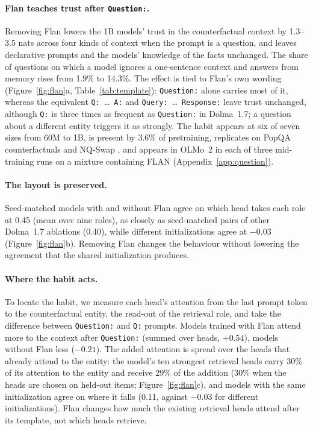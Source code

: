 \documentclass[11pt]{article}
\newcommand{\tmpl}[1]{\texttt{#1}}
\begin{document}
\paragraph{Flan teaches trust after \tmpl{Question:}.}
Removing Flan lowers the 1B models' trust in the counterfactual context by 1.3--3.5 nats across four kinds of context when the prompt is a question, and leaves declarative prompts and the models' knowledge of the facts unchanged.
The share of questions on which a model ignores a one-sentence context and answers from memory rises from 1.9\% to 14.3\%.
The effect is tied to Flan's own wording (Figure~\ref{fig:flan}a, Table~\ref{tab:template}): \tmpl{Question:} alone carries most of it, whereas the equivalent \tmpl{Q:}~\dots~\tmpl{A:} and \tmpl{Query:}~\dots~\tmpl{Response:} leave trust unchanged, although \tmpl{Q:} is three times as frequent as \tmpl{Question:} in Dolma~1.7; a question about a different entity triggers it as strongly.
The habit appears at six of seven sizes from 60M to 1B, is present by 3.6\% of pretraining, replicates on PopQA counterfactuals \citep{mallen2023popqa} and NQ-Swap \citep{longpre2021entity}, and appears in OLMo~2 \citep{olmo2024olmo2} in each of three mid-training runs on a mixture containing FLAN (Appendix~\ref{app:question}).

\paragraph{The layout is preserved.}
Seed-matched models with and without Flan agree on which head takes each role at 0.45 (mean over nine roles), as closely as seed-matched pairs of other Dolma~1.7 ablations (0.40), while different initializations agree at $-0.03$ (Figure~\ref{fig:flan}b).
Removing Flan changes the behaviour without lowering the agreement that the shared initialization produces.

\paragraph{Where the habit acts.}
To locate the habit, we measure each head's attention from the last prompt token to the counterfactual entity, the read-out of the retrieval role, and take the difference between \tmpl{Question:} and \tmpl{Q:} prompts.
Models trained with Flan attend more to the context after \tmpl{Question:} (summed over heads, $+0.54$), models without Flan less ($-0.21$).
The added attention is spread over the heads that already attend to the entity: the model's ten strongest retrieval heads carry 30\% of its attention to the entity and receive 29\% of the addition (30\% when the heads are chosen on held-out items; Figure~\ref{fig:flan}c), and models with the same initialization agree on where it falls (0.11, against $-0.03$ for different initializations).
Flan changes how much the existing retrieval heads attend after its template, not which heads retrieve.
\end{document}
